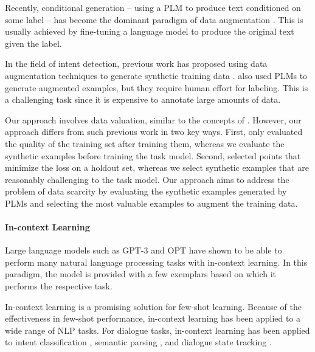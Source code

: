\documentclass[11pt]{article}
\begin{document}
Recently, conditional generation -- using a PLM to produce text conditioned on some label -- has become the dominant paradigm of data augmentation \cite{DBLP:conf/conll/BowmanVVDJB16,kumar-etal-2019-closer,DBLP:conf/aaai/Anaby-TavorCGKK20,DBLP:journals/corr/abs-2003-02245,yang-etal-2020-generative,DBLP:journals/corr/abs-2102-01335}. This is usually achieved by fine-tuning a language model to produce the original text given the label.

In the field of intent detection, previous work has proposed using data augmentation techniques to generate synthetic training data \cite{sahu-etal-2022-data,papangelis-etal-2021-generative}.
\citet{sahu-etal-2022-data} also used PLMs to generate augmented examples, but they require human effort for labeling.
This is a challenging task since it is expensive to annotate large amounts of data.

Our approach involves data valuation, similar to the concepts of \citet{DBLP:conf/icml/GhorbaniZ19,DBLP:conf/icml/MindermannBRS0X22}. However, our approach differs from such previous work in two key ways. First, \citet{DBLP:conf/icml/GhorbaniZ19} only evaluated the quality of the training set after training them, whereas we evaluate the synthetic examples before training the task model. Second, \citet{DBLP:conf/icml/MindermannBRS0X22} selected points that minimize the loss on a holdout set, whereas we select synthetic examples that are reasonably challenging to the task model. Our approach aims to address the problem of data scarcity by evaluating the synthetic examples generated by PLMs and selecting the most valuable examples to augment the training data.

\paragraph{In-context Learning}
Large language models such as GPT-3  \cite{DBLP:conf/nips/BrownMRSKDNSSAA20} and OPT \cite{DBLP:journals/corr/abs-2205-01068} have shown to be able to perform many natural language processing tasks with in-context learning. In this paradigm, the model is provided with a few exemplars based on which it performs the respective task.

In-context learning is a promising solution for few-shot learning.
Because of the effectiveness in few-shot performance, in-context learning has been applied to a wide range of NLP tasks. For dialogue tasks, in-context learning has been applied to intent classification \cite{yu-etal-2021-shot}, semantic parsing \cite{DBLP:conf/naacl/ShinD22}, and dialogue state tracking \cite{DBLP:journals/corr/abs-2203-08568}.
\end{document}
